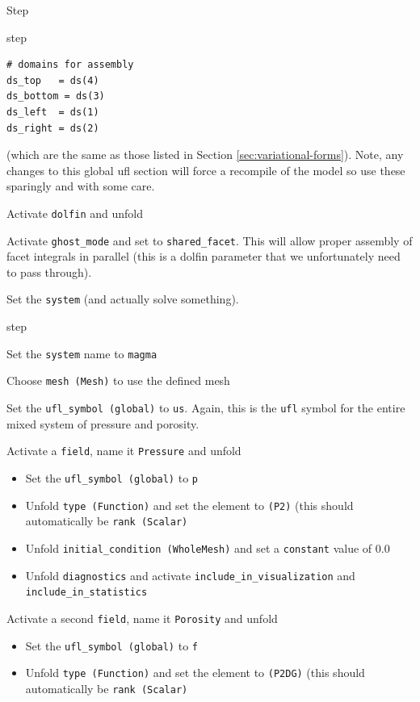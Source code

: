 \begin{steps}{Step}
\begin{steps}{step}
\begin{lstlisting}[style=UFL]
# domains for assembly
ds_top   = ds(4)
ds_bottom = ds(3)
ds_left  = ds(1)
ds_right = ds(2)
    \end{lstlisting}
(which are the same as those listed in Section
\ref{sec:variational-forms}).  Note, any changes to this global ufl
section will force a recompile of the model so use these sparingly and
with some care.  
\item Activate \texttt{dolfin} and unfold
\item Activate \texttt{ghost\_mode} and set to
  \texttt{shared\_facet}.  This will allow proper assembly of facet
  integrals in parallel (this is a dolfin parameter that we
  unfortunately need to pass through).
  \end{steps}
\item Set the \texttt{system} (and actually solve something).
  \begin{steps}{step}
  \item Set the \texttt{system} name to \texttt{magma}
  \item Choose \texttt{mesh (Mesh)} to use the defined mesh
  \item Set the \texttt{ufl\_symbol (global)} to \texttt{us}.  Again,
    this is the \texttt{ufl} symbol for the entire mixed system of
    pressure and porosity.
  \item Activate a \texttt{field}, name it \texttt{Pressure} and unfold
    \begin{itemize}
    \item Set the \texttt{ufl\_symbol (global)} to \texttt{p}
    \item Unfold \texttt{type (Function)} and set the element to
      \texttt{(P2)} (this should automatically be \texttt{rank
        (Scalar)}
    \item Unfold \texttt{initial\_condition (WholeMesh)} and set a
      \texttt{constant} value of 0.0
    \item Unfold \texttt{diagnostics} and activate
      \texttt{include\_in\_visualization} and \texttt{include\_in\_statistics}
    \end{itemize}
\item Activate a second \texttt{field}, name it \texttt{Porosity} and unfold
    \begin{itemize}
    \item Set the \texttt{ufl\_symbol (global)} to \texttt{f}
    \item Unfold \texttt{type (Function)} and set the element to
      \texttt{(P2DG)} (this should automatically be \texttt{rank
        (Scalar)}

\end{itemize}
\end{steps}
\end{steps}
